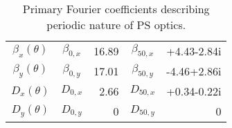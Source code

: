 \begin{table}
    \centering
    \begin{tabular}{c | c  r | c  r }
        $\beta_x(\theta)$ & $\beta_{0,x}$ & 16.89 & $\beta_{50,x}$ & +4.43-2.84i \\
        $\beta_y(\theta)$ & $\beta_{0,y}$ & 17.01 & $\beta_{50,y}$ & -4.46+2.86i \\
        $D_x(\theta)$     & $D_{0,x}$     & 2.66  & $D_{50,x}$     & +0.34-0.22i \\
        $D_y(\theta)$     & $D_{0,y}$     & 0     & $D_{50,y}$     & 0           \\
    \end{tabular}
    \caption{Primary Fourier coefficients describing periodic nature of PS optics.}
    \label{tab:ps_optics_fourier}
\end{table}